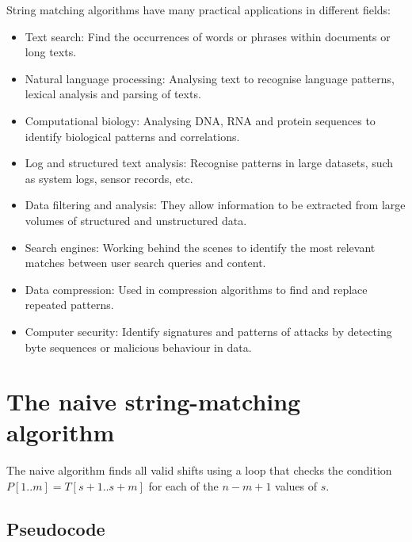 \documentclass[11pt]{article}
\begin{document}
        String matching algorithms have many practical applications in different fields:
        \begin{itemize}
            \item Text search: Find the occurrences of words or phrases within documents or long texts.
            \item Natural language processing: Analysing text to recognise language patterns, lexical analysis and parsing of texts.
            \item Computational biology: Analysing DNA, RNA and protein sequences to identify biological patterns and correlations.
            \item Log and structured text analysis: Recognise patterns in large datasets, such as system logs, sensor records, etc.
            \item Data filtering and analysis: They allow information to be extracted from large volumes of structured and unstructured data.
            \item Search engines: Working behind the scenes to identify the most relevant matches between user search queries and content.
            \item Data compression: Used in compression algorithms to find and replace repeated patterns.
            \item Computer security: Identify signatures and patterns of attacks by detecting byte sequences or malicious behaviour in data.
        \end{itemize}

    \section{The naive string-matching algorithm} \label{sec:naive_string_matching_algorithm}

        The naive algorithm finds all valid shifts using a loop that checks the condition $P[1..m] = T[s+1..s+m]$ for each of the $n - m + 1$ values of $s$.

        \subsection{Pseudocode} \label{subsec:naive_pseudocode}
\end{document}
